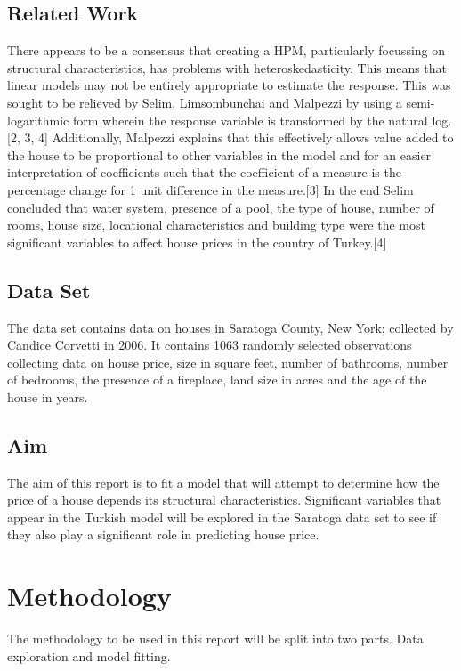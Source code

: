 \documentclass[10pt,A4,makeidx]{article}
\begin{document}
  \subsection{Related Work}
  There appears to be a consensus that creating a HPM, particularly focussing on
  structural characteristics, has problems with heteroskedasticity. This means
  that linear models may not be entirely appropriate to estimate the response.
  This was sought to be relieved by Selim, Limsombunchai and Malpezzi by using
  a semi-logarithmic form wherein the response variable is transformed by the natural log.[2, 3, 4]
  Additionally, Malpezzi explains
  that this effectively allows value added to the house to be proportional to 
  other variables in the model and for an easier interpretation of coefficients
  such that the coefficient of a measure is the percentage change for 1 unit 
  difference in the measure.[3]
  In the end Selim concluded that water system, presence of a pool, the type of house,
  number of rooms, house size, locational characteristics and building type were
  the most significant variables to affect house prices in the country of Turkey.[4]
    
  \subsection{Data Set}
  The data set contains data on houses in Saratoga County, New York; collected by
  Candice Corvetti in 2006. It contains 1063 randomly selected observations collecting
  data on house price, size in square feet, number of bathrooms, number of bedrooms,
  the presence of a fireplace, land size in acres and the age of the house in years.
  
  \subsection{Aim}
  The aim of this report is to fit a model that will attempt to determine how 
  the price of a house depends its structural characteristics. Significant 
  variables that appear in the Turkish model will be explored in the Saratoga 
  data set to see if they also play a significant role in predicting house price.

\section{Methodology}
The methodology to be used in this report will be split into two parts. Data
exploration and model fitting.
\end{document}

